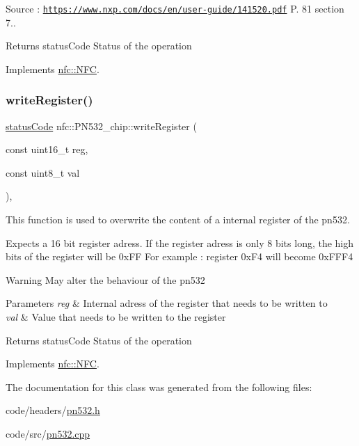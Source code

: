 Source \+: \href{https://www.nxp.com/docs/en/user-guide/141520.pdf}{\tt https\+://www.\+nxp.\+com/docs/en/user-\/guide/141520.\+pdf} P. 81 section 7.. \begin{DoxyReturn}{Returns}
status\+Code Status of the operation 
\end{DoxyReturn}


Implements \hyperlink{classnfc_1_1NFC_a606b08348cb8176a38b2dd9fc1136888}{nfc\+::\+N\+FC}.

\mbox{\label{classnfc_1_1PN532__chip_a2b82f8ed84c6a9b4a7f0c1ad699c13a7}} 
\subsubsection{\texorpdfstring{write\+Register()}{writeRegister()}}
{\footnotesize\ttfamily \hyperlink{declarations_8h_ae1d20c5a38cae82ccaa6a77be3fd264b}{status\+Code} nfc\+::\+P\+N532\+\_\+chip\+::write\+Register (\begin{DoxyParamCaption}\item[{const uint16\+\_\+t}]{reg,  }\item[{const uint8\+\_\+t}]{val }\end{DoxyParamCaption})\hspace{0.3cm}{\ttfamily [override]}, {\ttfamily [virtual]}}



This function is used to overwrite the content of a internal register of the pn532. 

Expects a 16 bit register adress. If the register adress is only 8 bits long, the high bits of the register will be 0x\+FF For example \+: register 0x\+F4 will become 0x\+F\+F\+F4 \begin{DoxyWarning}{Warning}
May alter the behaviour of the pn532 
\end{DoxyWarning}

\begin{DoxyParams}{Parameters}
{\em reg} & Internal adress of the register that needs to be written to \\
\hline
{\em val} & Value that needs to be written to the register \\
\hline
\end{DoxyParams}
\begin{DoxyReturn}{Returns}
status\+Code Status of the operation 
\end{DoxyReturn}


Implements \hyperlink{classnfc_1_1NFC_a7e0a000aadae9b545e94ba213d4ac24e}{nfc\+::\+N\+FC}.



The documentation for this class was generated from the following files\+:\begin{DoxyCompactItemize}
\item 
code/headers/\hyperlink{pn532_8h}{pn532.\+h}\item 
code/src/\hyperlink{pn532_8cpp}{pn532.\+cpp}\end{DoxyCompactItemize}
